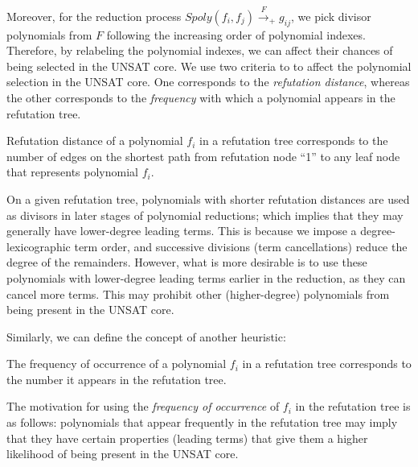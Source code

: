 Moreover, for the reduction process
$Spoly(f_i,f_j)\xrightarrow{F}_+g_{ij}$, we pick divisor polynomials from
$F$ following the increasing order of polynomial indexes. Therefore,
by relabeling the polynomial indexes, we can affect their
chances of being selected in the UNSAT core. We use two criteria to
to affect the polynomial selection in the UNSAT core. One corresponds
to the \emph{refutation distance}, whereas the other corresponds to
the {\it frequency} with which a polynomial appears in the refutation
tree.  

\begin{Definition}
Refutation distance of a polynomial $f_i$ in a refutation tree
corresponds to the number of edges on the shortest path from refutation
node ``1'' to any leaf node that represents polynomial $f_i$. 
\end{Definition}

On a given refutation tree, polynomials with shorter refutation
distances are used as divisors in later stages of polynomial
reductions; which implies that they may generally have lower-degree
leading terms. This is because we impose a degree-lexicographic term
order, and successive divisions (term cancellations) reduce the degree
of the remainders. However, what is more desirable is to use these
polynomials with lower-degree leading terms earlier in the reduction,
as they can cancel more terms. This may prohibit other (higher-degree)
polynomials from being present in the UNSAT core. 



Similarly, we can define the concept of another heuristic:
\begin{Definition}
The frequency of occurrence of a polynomial $f_i$ in a refutation tree
corresponds to the number it appears in the refutation tree. 
\end{Definition}

The motivation for using the \emph{frequency of occurrence}
of $f_i$ in the refutation tree is as follows: polynomials that appear
frequently in the refutation tree may imply that they have certain
properties (leading terms) that give them a higher likelihood of being
present in the UNSAT core. 

